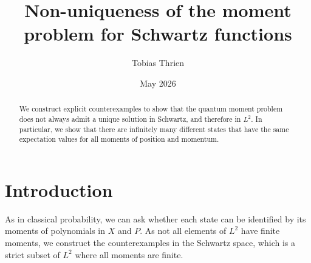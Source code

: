 \documentclass{techbrief}
\title{Non-uniqueness of the moment problem for Schwartz functions}
\author{Tobias Thrien}
\date{May 2026}
\begin{document}
	
\maketitle
	
\begin{abstract}
	We construct explicit counterexamples to show that the quantum moment problem does not always admit a unique solution in Schwartz, and therefore in $L^2$. In particular, we show that there are infinitely many different states that have the same expectation values for all moments of position and momentum.
\end{abstract}

\section{Introduction}
As in classical probability, we can ask whether each state can be identified by its moments of polynomials in $X$ and $P$. As not all elements of $L^2$ have finite moments, we construct the counterexamples in the Schwartz space, which is a strict subset of $L^2$ where all moments are finite.
\end{document}
